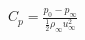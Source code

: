 \documentclass[10pt]{article}
\begin{document}
\begin{align*}C_{p}=\frac{p_{0} - p_{\infty}}{ \frac{1}{2} \rho_{\infty} u^{2}_{\infty}}\end{align*}
\end{document}
